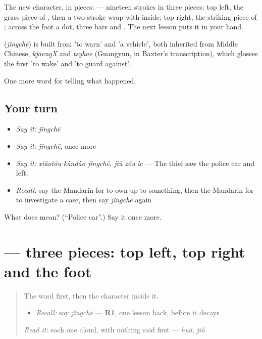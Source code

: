 The new character, in pieces:  — nineteen strokes in three pieces: top left, the grass piece of , then a two-stroke wrap with  inside; top right, the striking piece of ; across the foot a dot, three bars and . The next lesson puts it in your hand.

\begin{cousinweb}
\textbf{} (\emph{jǐngchē}) is built from  'to warn' and  'a vehicle', both inherited from Middle Chinese, \emph{kjaengX} and \emph{tsyhae} (Guangyun, in Baxter's transcription), which glosses the first 'to wake' and 'to guard against'.
\end{cousinweb}

\begin{grammarlens}[title={What you've built}]
One more word for telling what happened.
\end{grammarlens}

\subsection*{Your turn}
\begin{itemize}
\raggedright
  \item \emph{Say it:} \emph{jǐngchē}
  \item \emph{Say it:} \emph{jǐngchē}, once more
  \item \emph{Say it:} \emph{xiǎotōu kàndào jǐngchē, jiù zǒu le} — The thief saw the police car and left.
  \item \emph{Recall:} say the Mandarin for to own up to something, then the Mandarin for to investigate a case, then say \emph{jǐngchē} again
\end{itemize}

\begin{tcolorbox}[breakable,colback=teal!4,colframe=teal!35!black,title={Before you move on}]
What does  mean? (\textquotedblleft{}Police car\textquotedblright{}.) Say it once more.
\end{tcolorbox}
\section[\texorpdfstring{\zh{警} (jǐng)}{警 (jǐng)}]{ — three pieces: top left, top right and the foot}

\label{lesson:ZH-W311-jing-alert}



\begin{quote}
The word first, then the character inside it.

\begin{itemize}
\raggedright
  \item \emph{Recall:} say \emph{jǐngchē} — \textbf{R1}, one lesson back, before it decays
\end{itemize}

\begin{quote}
 
\end{quote}

\emph{Read it:} each one aloud, with nothing said first — \emph{huā}, \emph{jiù}
\end{quote}

